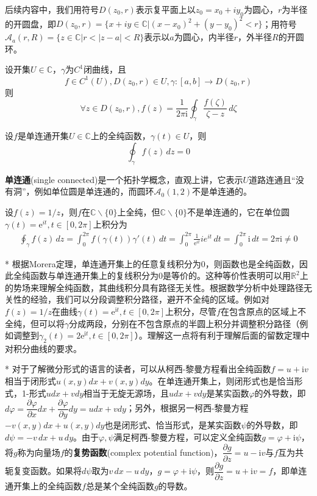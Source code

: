 后续内容中，我们用符号$D(z_0,r)$表示复平面上以$z_0=x_0+iy_0$为圆心，$r$为半径的开圆盘，即$D(z_0,r)=\{x+iy\in\mathbb{C}\big| (x-x_0)^2+(y-y_0)^2<r\}$；用符号$\mathcal{A} _a(r,R)=\{z\in\mathbb{C}|r<|z-a|<R\}$表示以$a$为圆心，内半径$r$，外半径$R$的开圆环。
\begin{theorem}[柯西积分公式]
    设开集$U\in\mathbb{C}$，$\gamma$为$C^1$闭曲线，且$$f\in C^1(U),D(z_0,r)\in U,\gamma:[a,b]\to D(z_0,r)$$则
    \[\forall z\in D(z_0,r),f(z)=\frac{1}{2\pi \mathrm{i}}\oint_{\gamma}\frac{f(\zeta)}{\zeta-z}\,d\zeta\]
\end{theorem}
\begin{theorem}[柯西积分定理]
    设$f$是单连通开集$U\in\mathbb{C}$上的全纯函数，$\gamma(t)\in U$，则
    \[\oint_{\gamma}f(z)\,dz=0\]
\end{theorem}
\begin{remark}
    \textbf{单连通}(single connected)是一个拓扑学概念，直观上讲，它表示$U$道路连通且“没有洞”，例如单位圆是单连通的，而圆环$\mathcal{A}_0(1,2)$不是单连通的。
\end{remark}
\begin{example}
设$f(z)=1/z$，则$f$在$\mathbb{C}\backslash\{0\}$上全纯，但$\mathbb{C}\backslash\{0\}$不是单连通的，它在单位圆$\gamma(t)=\mathrm{e}^{it},t\in[0,2\pi]$上积分为\begin{align*}
    \oint_{\gamma}f(z)\,dz=\int_0^{2\pi}f(\gamma(t))\gamma'(t)\,dt=\int_0^{2\pi}\frac{1}{\mathrm{e}^{it}}ie^{it}\,dt=\int_0^{2\pi}\mathrm{i}\,dt=2\pi \mathrm{i}\neq 0
\end{align*}
\end{example}

\begin{remark}*
    根据Morera定理，单连通开集上的任意复线积分为0，则函数也是全纯函数，因此全纯函数与单连通开集上的复线积分为0是等价的。这种等价性表明可以用$\mathbb{R}^2$上的势场来理解全纯函数，其曲线积分具有路径无关性。根据数学分析中处理路径无关性的经验，我们可以分段调整积分路径，避开不全纯的区域。例如对$f(z)=1/z$在曲线$\gamma(t)=\mathrm{e}^{\mathrm{i}t},t\in[0,2\pi]$上积分，尽管$f$在包含原点的区域上不全纯，但可以将$\gamma$分成两段，分别在不包含原点的半圆上积分并调整积分路径（例如调整到$\gamma_2(t)=2\mathrm{e}^{\mathrm{i}t},t\in[0,2\pi]$）。理解这一点将有利于理解后面的留数定理中对积分曲线的要求。
\end{remark}

\begin{remark}*
    对于了解微分形式的语言的读者，可以从柯西-黎曼方程看出全纯函数$f=u+\mathrm{i}v$相当于闭形式$u(x,y)dx+v(x,y)dy$。在单连通开集上，则闭形式也是恰当形式，1-形式$udx+vdy$相当于无旋无源场，且$udx+vdy$是某实函数$\varphi$的外导数，即$d\varphi=\dfrac{\partial \varphi}{\partial x}dx+\dfrac{\partial \varphi}{\partial y}dy=udx+vdy$；另外，根据另一柯西-黎曼方程$-v(x,y)dx+u(x,y)dy$也是闭形式、恰当形式，是某实函数$\psi$的外导数，即$d\psi=-v\,dx+u\,dy$。由于$\varphi,\psi$满足柯西-黎曼方程，可以定义全纯函数$g=\varphi+\mathrm{i}\psi$，将$g$称为向量场$f$的\textbf{复势函数}(complex potential function)，$\dfrac{\partial g}{\partial z}=u-\mathrm{i}v$与$f$互为共轭复变函数。如果将$d\psi$取为$v\,dx-u\,dy$，$g=\varphi+\mathrm{i}\psi$，则$\dfrac{\partial g}{\partial z}=u+\mathrm{i}v=f$，即单连通开集上的全纯函数$f$总是某个全纯函数$g$的导数。
\end{remark}

